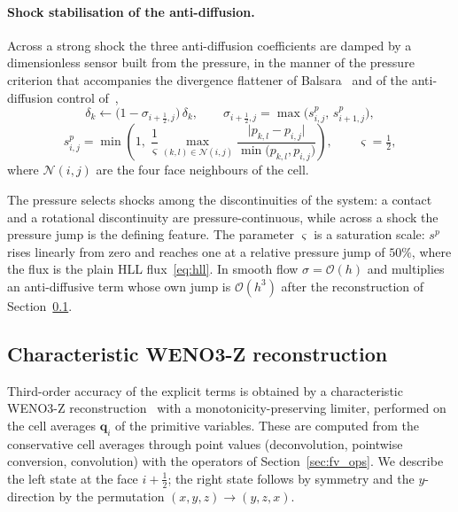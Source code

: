 \documentclass[a4paper,fleqn]{cas-sc}
\theoremstyle{remark}
\begin{document}
\paragraph{Shock stabilisation of the anti-diffusion.}
Across a strong shock the three anti-diffusion coefficients are damped by a
dimensionless sensor built from the pressure, in the manner of the pressure
criterion that accompanies the divergence flattener of
Balsara~\cite{Balsara2012} and of the anti-diffusion control
of~\cite{SimonMandal2019},
\begin{equation}
\label{eq:flattener}
\delta_k \longleftarrow \bigl(1-\sigma_{i+\frac12,j}\bigr)\,\delta_k,
\qquad
\sigma_{i+\frac12,j}=\max\bigl(s^{p}_{i,j},\,s^{p}_{i+1,j}\bigr),
\end{equation}
\begin{equation}
\label{eq:sp}
s^{p}_{i,j}=\min\!\left(1,\;\frac{1}{\varsigma}
\max_{(k,l)\in\mathcal N(i,j)}
\frac{\bigl|p_{k,l}-p_{i,j}\bigr|}{\min\bigl(p_{k,l},p_{i,j}\bigr)}\right),
\qquad \varsigma=\tfrac12,
\end{equation}
where $\mathcal N(i,j)$ are the four face neighbours of the cell.

The pressure selects shocks among the discontinuities of the system: a contact
and a rotational discontinuity are pressure-continuous, while across a shock the
pressure jump is the defining feature. The parameter $\varsigma$ is a saturation
scale: $s^{p}$ rises linearly from zero and reaches one at a relative pressure
jump of $50\%$, where the flux is the plain HLL flux~\eqref{eq:hll}. In smooth
flow $\sigma=\mathcal O(h)$ and multiplies an anti-diffusive term whose own jump
is $\mathcal O(h^{3})$ after the reconstruction of
Section~\ref{sec:reconstruction}.


\subsection{Characteristic WENO3-Z reconstruction}
\label{sec:reconstruction}

Third-order accuracy of the explicit terms is obtained by a characteristic
WENO3-Z reconstruction~\cite{DonBorges2013} with a monotonicity-preserving
limiter, performed on the cell averages $\mathbf q_i$ of the primitive variables.
These are computed from the conservative cell averages through point values
(deconvolution, pointwise conversion, convolution) with the operators of
Section~\ref{sec:fv_ops}. We describe the left state at the face $i+\tfrac12$;
the right state follows by symmetry and the $y$-direction by the permutation
$(x,y,z)\to(y,z,x)$.
\end{document}

